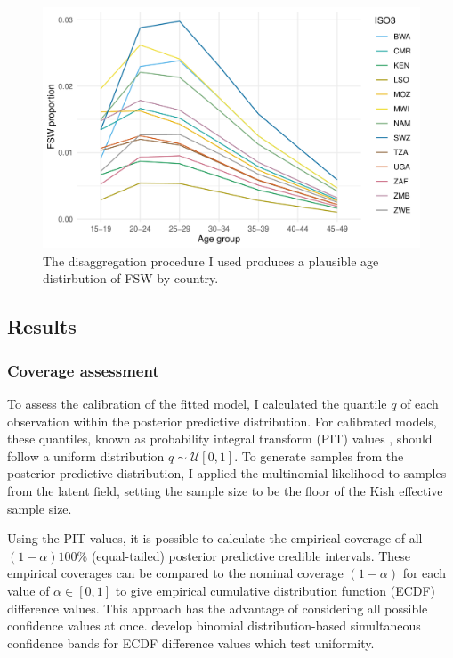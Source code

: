 \documentclass[a4paper, nobind]{templates/ociamthesis}
\begin{document}
\begin{figure}

{\centering \includegraphics[width=0.9\linewidth]{resources/multi-agyw/20230627-144735-3da88508/depends/age-disagg-fsw-line} 

}

\caption{The disaggregation procedure I used produces a plausible age distirbution of FSW by country.}\label{fig:age-disagg-fsw-line}
\end{figure}

\hypertarget{results-2}{%
\subsection{Results}\label{results-2}}

\hypertarget{coverage-assessment}{%
\subsubsection{Coverage assessment}\label{coverage-assessment}}

To assess the calibration of the fitted model, I calculated the quantile \(q\) of each observation within the posterior predictive distribution.
For calibrated models, these quantiles, known as probability integral transform (PIT) values \autocite{dawid1984present,bosse2022scoringutils}, should follow a uniform distribution \(q \sim \mathcal{U}[0, 1]\).
To generate samples from the posterior predictive distribution, I applied the multinomial likelihood to samples from the latent field, setting the sample size to be the floor of the Kish effective sample size.

Using the PIT values, it is possible to calculate the empirical coverage of all \((1 - \alpha)100\)\% (equal-tailed) posterior predictive credible intervals.
These empirical coverages can be compared to the nominal coverage \((1 - \alpha)\) for each value of \(\alpha \in [0, 1]\) to give empirical cumulative distribution function (ECDF) difference values.
This approach has the advantage of considering all possible confidence values at once.
\textcite{sailynoja2021graphical} develop binomial distribution-based simultaneous confidence bands for ECDF difference values which test uniformity.
\end{document}
